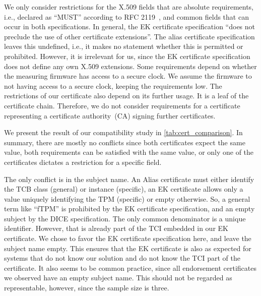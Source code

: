 We only consider restrictions for the X.509 fields that are absolute requirements, i.e., declared as ``MUST'' according to RFC 2119~\cite{Bradner1997}, and common fields that can occur in both specifications.
In general, the EK certificate specification ``does not preclude the use of other certificate extensions''.
The alias certificate specification leaves this undefined, i.e., it makes no statement whether this is permitted or prohibited.
However, it is irrelevant for us, since the EK certificate specification does not define any own X.509 extensions.
Some requirements depend on whether the measuring firmware has access to a secure clock.
We assume the firmware to not having access to a secure clock, keeping the requirements low.
The restrictions of our certificate also depend on its further usage.
It is a leaf of the certificate chain.
Therefore, we do not consider requirements for a certificate representing a certificate authority~(CA) signing further certificates.

We present the result of our compatibility study in \autoref{tab:cert_comparison}.
In summary, there are mostly no conflicts since both certificates expect the same value, both requirements can be satisfied with the same value, or only one of the certificates dictates a restriction for a specific field.



The only conflict is in the subject name.
An Alias certificate must either identify the TCB class (general) or instance (specific), an EK certificate allows only a value uniquely identifying the TPM (specific) or empty otherwise.
So, a general term like ``fTPM'' is prohibited by the EK certificate specification, and an empty subject by the DICE specification.
The only common denominator is a unique identifier.
However, that is already part of the TCI embedded in our EK certificate.
We chose to favor the EK certificate specification here, and leave the subject name empty.
This ensures that the EK certificate is also as expected for systems that do not know our solution and do not know the TCI part of the certificate.
It also seems to be common practice, since all endorsement certificates we observed have an empty subject name.
This should not be regarded as representable, however, since the sample size is three.

